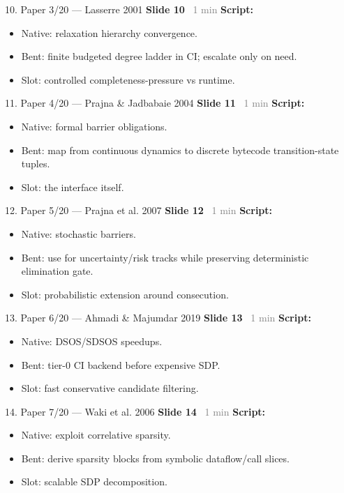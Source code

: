 \documentclass[aspectratio=169]{beamer}
\newcommand{\syncline}[2]{\textbf{#1} \hfill \textcolor{gray}{#2}}
\begin{document}
\begin{frame}[shrink=18]{10. Paper 3/20 — Lasserre 2001}
\syncline{Slide 10}{~1 min}
\textbf{Script:}
\begin{itemize}
  \item Native: relaxation hierarchy convergence.
  \item Bent: finite budgeted degree ladder in CI; escalate only on need.
  \item Slot: controlled completeness-pressure vs runtime.
\end{itemize}
\end{frame}

\begin{frame}[shrink=18]{11. Paper 4/20 — Prajna \& Jadbabaie 2004}
\syncline{Slide 11}{~1 min}
\textbf{Script:}
\begin{itemize}
  \item Native: formal barrier obligations.
  \item Bent: map from continuous dynamics to discrete bytecode transition-state tuples.
  \item Slot: the interface itself.
\end{itemize}
\end{frame}

\begin{frame}[shrink=18]{12. Paper 5/20 — Prajna et al. 2007}
\syncline{Slide 12}{~1 min}
\textbf{Script:}
\begin{itemize}
  \item Native: stochastic barriers.
  \item Bent: use for uncertainty/risk tracks while preserving deterministic elimination gate.
  \item Slot: probabilistic extension around consecution.
\end{itemize}
\end{frame}

\begin{frame}[shrink=18]{13. Paper 6/20 — Ahmadi \& Majumdar 2019}
\syncline{Slide 13}{~1 min}
\textbf{Script:}
\begin{itemize}
  \item Native: DSOS/SDSOS speedups.
  \item Bent: tier-0 CI backend before expensive SDP.
  \item Slot: fast conservative candidate filtering.
\end{itemize}
\end{frame}

\begin{frame}[shrink=18]{14. Paper 7/20 — Waki et al. 2006}
\syncline{Slide 14}{~1 min}
\textbf{Script:}
\begin{itemize}
  \item Native: exploit correlative sparsity.
  \item Bent: derive sparsity blocks from symbolic dataflow/call slices.
  \item Slot: scalable SDP decomposition.
\end{itemize}
\end{frame}
\end{document}
